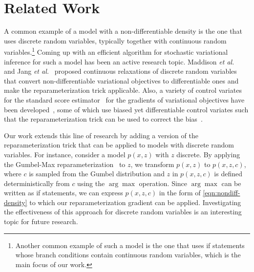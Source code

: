 
\section{Related Work}
\label{sec:related}

A common example of a model with a non-differentiable density is the one that uses discrete random variables, typically together with continuous random variables.\footnote{
  Another common example of such a model is the one
  that uses if statements whose branch conditions contain continuous random variables,
  which is the main focus of our work.
}
Coming up with an efficient algorithm for stochastic variational inference for such a model has been an active research topic. Maddison \emph{et al.}~\cite{MaddisonICLR17} and Jang \emph{et al.}~\cite{JangICLR17} proposed continuous relaxations of discrete random variables that convert non-differentiable variational objectives to differentiable ones and make the reparameterization trick applicable. Also, a variety of control variates for the standard score estimator~\cite{WilliamsMLJ1992,PaisleyICML12,WingateBBVI13,RanganathAISTATS14} for the gradients of variational objectives have been developed~\cite{RanganathAISTATS14,GuICLR16,GuICLR17,TuckerNIPS17,GrathwohlICLR18,MillerReparam2017}, some of which use biased yet differentiable control variates such that the reparameterization trick can be used to correct the bias~\cite{GuICLR16,TuckerNIPS17,GrathwohlICLR18}.

Our work extends this line of research by adding a version of the reparameterization trick that can be applied to models with discrete random variables.
For instance, consider a model $p(x,z)$ with $z$ discrete.
By applying the Gumbel-Max reparameterization~\cite{GumbelBook,MaddisonNIPS16} to $z$,
we transform $p(x,z)$ to $p(x,z,c)$,
where $c$ is sampled from the Gumbel distribution
and $z$ in $p(x,z,c)$ is defined deterministically from $c$ using the $\arg\max$ operation.
Since $\arg\max$ can be written as if statements,
we can express $p(x,z,c)$ in the form of \eqref{eqn:nondiff-density}
to which our reparameterization gradient can be applied. Investigating the effectiveness of this approach for discrete random variables is an interesting topic for future research.

